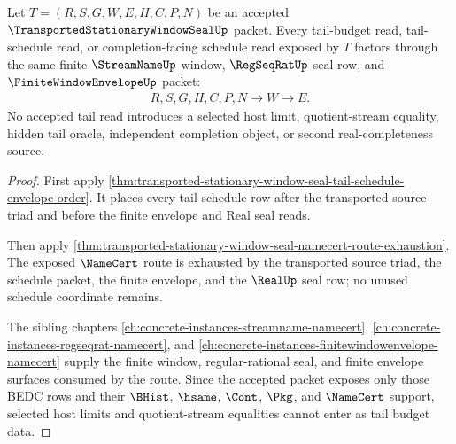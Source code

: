 \begin{theorem}
\label{thm:transported-stationary-window-seal-tail-budget-coverage}
Let $T=(R,S,G,W,E,H,C,P,N)$ be an accepted $\TransportedStationaryWindowSealUp$ packet. Every tail-budget read, tail-schedule read, or completion-facing schedule read exposed by $T$ factors through the same finite $\StreamNameUp$ window, $\RegSeqRatUp$ seal row, and $\FiniteWindowEnvelopeUp$ packet:
$$
\begin{aligned}
  R,S,G,H,C,P,N
  \longrightarrow
  W
  \longrightarrow
  E .
\end{aligned}
$$
No accepted tail read introduces a selected host limit, quotient-stream equality, hidden tail oracle, independent completion object, or second real-completeness source.
\end{theorem}
\begin{proof}
First apply \autoref{thm:transported-stationary-window-seal-tail-schedule-envelope-order}. It places every tail-schedule row after the transported source triad and before the finite envelope and Real seal reads.

Then apply \autoref{thm:transported-stationary-window-seal-namecert-route-exhaustion}. The exposed $\NameCert$ route is exhausted by the transported source triad, the schedule packet, the finite envelope, and the $\RealUp$ seal row; no unused schedule coordinate remains.

The sibling chapters \autoref{ch:concrete-instances-streamname-namecert}, \autoref{ch:concrete-instances-regseqrat-namecert}, and \autoref{ch:concrete-instances-finitewindowenvelope-namecert} supply the finite window, regular-rational seal, and finite envelope surfaces consumed by the route. Since the accepted packet exposes only those BEDC rows and their $\BHist$, $\hsame$, $\Cont$, $\Pkg$, and $\NameCert$ support, selected host limits and quotient-stream equalities cannot enter as tail budget data.
\end{proof}

